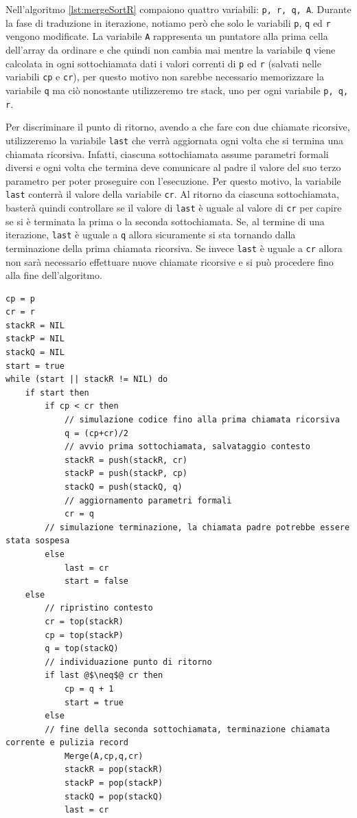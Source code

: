 Nell'algoritmo \ref{lst:mergeSortR} compaiono quattro variabili: \texttt{p, r, q, A}. Durante la fase di traduzione in iterazione, notiamo però che solo le variabili \texttt{p}, \texttt{q} ed \texttt{r} vengono modificate. La variabile \texttt{A} rappresenta un puntatore alla prima cella dell'array da ordinare e che quindi non cambia mai mentre la variabile \texttt{q} viene calcolata in ogni sottochiamata dati i valori correnti di \texttt{p} ed \texttt{r} (salvati nelle variabili \texttt{cp} e \texttt{cr}), per questo motivo non sarebbe necessario memorizzare la variabile \texttt{q} ma ciò nonostante utilizzeremo tre stack, uno per ogni variabile \texttt{p, q, r}.

Per discriminare il punto di ritorno, avendo a che fare con due chiamate ricorsive, utilizzeremo la variabile \texttt{last} che verrà aggiornata ogni volta che si termina una chiamata ricorsiva. Infatti, ciascuna sottochiamata assume parametri formali diversi e ogni volta che termina deve comunicare al padre il valore del suo terzo parametro per poter proseguire con l'esecuzione. Per questo motivo, la variabile \texttt{last} conterrà il valore della variabile \texttt{cr}. Al ritorno da ciascuna sottochiamata, basterà quindi controllare se il valore di \texttt{last} è uguale al valore di \texttt{cr} per capire se si è terminata la prima o la seconda sottochiamata. Se, al termine di una iterazione, \texttt{last} è uguale a \texttt{q} allora sicuramente si sta tornando dalla terminazione della prima chiamata ricorsiva. Se invece \texttt{last} è uguale a \texttt{cr} allora non sarà necessario effettuare nuove chiamate ricorsive e si può procedere fino alla fine dell'algoritmo.

\begin{lstlisting}[caption={\textsc{MergeSort\_Iter}(A,p,r)},language=asd,label={lst:mergeSortI}]
cp = p
cr = r
stackR = NIL
stackP = NIL
stackQ = NIL
start = true
while (start || stackR != NIL) do
	if start then
		if cp < cr then
			// simulazione codice fino alla prima chiamata ricorsiva
			q = (cp+cr)/2
			// avvio prima sottochiamata, salvataggio contesto
			stackR = push(stackR, cr)
			stackP = push(stackP, cp)
			stackQ = push(stackQ, q)
			// aggiornamento parametri formali
			cr = q
		// simulazione terminazione, la chiamata padre potrebbe essere stata sospesa
		else
			last = cr
			start = false
	else
		// ripristino contesto
		cr = top(stackR)
		cp = top(stackP)
		q = top(stackQ)
		// individuazione punto di ritorno
		if last @$\neq$@ cr then
			cp = q + 1
			start = true
		else
		// fine della seconda sottochiamata, terminazione chiamata corrente e pulizia record
			Merge(A,cp,q,cr)
			stackR = pop(stackR)
			stackP = pop(stackP)
			stackQ = pop(stackQ)
			last = cr
\end{lstlisting}

